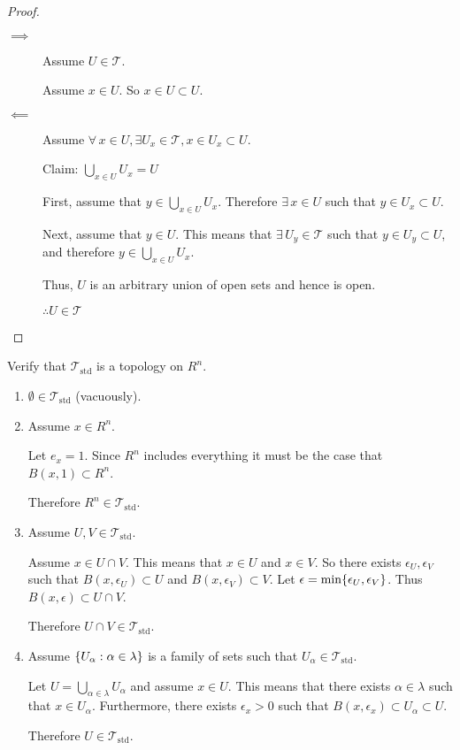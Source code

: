 \documentclass[letterpaper,12pt,fleqn]{article}
\newcommand{\T}{\mathscr{T}}
\newcommand{\Tstd}{\T_{\text{std}}}
\renewcommand{\a}{\alpha}
\renewcommand{\l}{\lambda}
\newcommand{\e}{\epsilon}
\begin{document}
\begin{proof}
  \begin{description}
  \item[]

  \item[\(\implies\)] Assume \(U\in\T\).

    Assume \(x\in U\).  So \(x\in U\subset U\).

  \item[\(\impliedby\)] Assume \(\forall\,x\in U,\exists U_x\in\T,x\in U_x\subset U\).

    Claim: \(\bigcup_{x\in U}U_x=U\)

    First, assume that \(y\in \bigcup_{x\in U}U_x\).  Therefore \(\exists\,x\in U\) such that \(y\in U_x\subset U\).

    Next, assume that \(y\in U\).  This means that \(\exists\,U_y\in\T\) such that \(y\in U_y\subset U\), and
    therefore \(y\in\bigcup_{x\in U}U_x\).

    Thus, \(U\) is an arbitrary union of open sets and hence is open.

    \(\therefore U\in\T\)
  \end{description}
\end{proof}

\begin{example}[Exercise 2.4]
  Verify that \(\Tstd\) is a topology on \(R^n\).

  \begin{enumerate}
  \item \(\emptyset\in\Tstd\) (vacuously).

  \item Assume \(x\in R^n\).

    Let \(e_x=1\).  Since \(R^n\) includes everything it must be the case that \(B(x,1)\subset R^n\).

    Therefore \(R^n\in\Tstd\).

  \item Assume \(U,V\in\Tstd\).

    Assume \(x\in U\cap V\).  This means that \(x\in U\) and \(x\in V\).  So there exists \(\e_U,\e_V\) such that
    \(B(x,\e_U)\subset U\) and \(B(x,\e_V)\subset V\).  Let \(\e=\min\set{\e_U,\e_V}\).  Thus
    \(B(x,\e)\subset U\cap V\).

    Therefore \(U\cap V\in\Tstd\).

  \item Assume \(\set{U_{\a}:\a\in\l}\) is a family of sets such that \(U_{\a}\in\Tstd\).

    Let \(U=\bigcup_{\a\in\l}U_{\a}\) and assume \(x\in U\).  This means that there exists \(\a\in\l\) such that
    \(x\in U_{\a}\).  Furthermore, there exists \(\e_x>0\) such that \(B(x,\e_x)\subset U_{\a}\subset U\).

    Therefore \(U\in\Tstd\).
  \end{enumerate}
\end{example}
\end{document}
